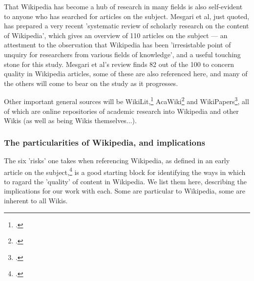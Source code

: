 \documentclass[a4paper,11pt,twoside,notitlepage]{article}
\renewcommand{\cite}[1]{\footcite{#1}}
\begin{document}
        That Wikipedia has become a hub of research in many fields is
        also self-evident to anyone who has searched for articles on
        the subject. Mesgari et al, just quoted, has prepared a very
        recent 'systematic review of scholarly research on the content
        of Wikipedia', which gives an overview of 110 articles on the
        subject --- an attestment to the observation that Wikipedia
        has been 'irresistable point of unquiry for researchers from
        various fields of knowledge', and a useful touching stone for
        this study. Mesgari et al's review finds 82 out of the 100 to
        concern quality in Wikipedia articles, some of these are also
        referenced here, and many of the others will come to bear on
        the study as it progresses.

        Other important general sources will be WikiLit,\cite{wikilit}
        AcaWiki\cite{acawiki} and WikiPapers\cite{wikipapers}, all of
        which are online repositories of academic research into
        Wikipedia and other Wikis (as well as being Wikis
        themselves...).

        \subsubsection{The particularities of Wikipedia, and implications}
        The six 'risks' one takes when referencing Wikipedia, as
        defined in an early article on the subject,\cite{Denning2005}
        is a good starting block for identifying the ways in which to
        ragard the 'quality' of content in Wikipedia. We list them
        here, describing the implications for our work with each. Some
        are particular to Wikipedia, some are inherent to all Wikis.
        
\end{document}
